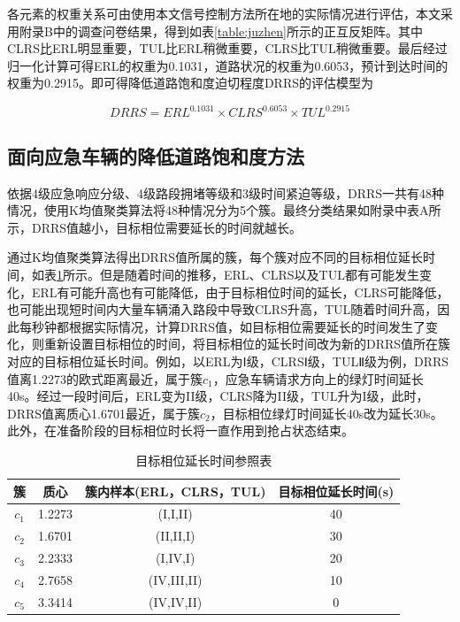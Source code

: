 各元素的权重关系可由使用本文信号控制方法所在地的实际情况进行评估，本文采用附录B中的调查问卷结果，得到如表\ref{table:juzhen}所示的正互反矩阵。其中CLRS比ERL明显重要，TUL比ERL稍微重要，CLRS比TUL稍微重要。最后经过归一化计算可得ERL的权重为0.1031，道路状况的权重为0.6053，预计到达时间的权重为0.2915。即可得降低道路饱和度迫切程度DRRS的评估模型为

\begin{equation}
	\label{equation:DRRS}
	DRRS={ERL}^{0.1031}\times{CLRS}^{0.6053}\times{TUL}^{0.2915} 
\end{equation}

\subsection{面向应急车辆的降低道路饱和度方法}

依据4级应急响应分级、4级路段拥堵等级和3级时间紧迫等级，DRRS一共有48种情况，使用K均值聚类算法将48种情况分为5个簇。最终分类结果如附录中表A所示，DRRS值越小，目标相位需要延长的时间就越长。



通过K均值聚类算法得出DRRS值所属的簇，每个簇对应不同的目标相位延长时间，如表\ref{table:extendtime}所示。但是随着时间的推移，ERL、CLRS以及TUL都有可能发生变化，ERL有可能升高也有可能降低，由于目标相位时间的延长，CLRS可能降低，也可能出现短时间内大量车辆涌入路段中导致CLRS升高，TUL随着时间升高，因此每秒钟都根据实际情况，计算DRRS值，如目标相位需要延长的时间发生了变化，则重新设置目标相位的时间，将目标相位的延长时间改为新的DRRS值所在簇对应的目标相位延长时间。例如，以ERL为Ⅰ级，CLRSⅠ级，TULⅡ级为例，DRRS值离1.2273的欧式距离最近，属于簇${c_1}$，应急车辆请求方向上的绿灯时间延长40s。经过一段时间后，ERL变为II级，CLRS降为II级，TUL升为I级，此时，DRRS值离质心1.6701最近，属于簇${c_2}$，目标相位绿灯时间延长40s改为延长30s。此外，在准备阶段的目标相位时长将一直作用到抢占状态结束。

\begin{table}[H]
	\centering
	\caption{目标相位延长时间参照表}
	\label{table:extendtime}
	\begin{tabular}{|c|c|c|c|}
		\hline
		簇 & 质心 & 簇内样本(ERL，CLRS，TUL) &  目标相位延长时间(s) \\
		\hline
		${c_1}$ & 1.2273 & (I,I,II) & 40 \\ \hline
		${c_2}$ & 1.6701 & (II,II,I) & 30 \\ \hline
		${c_3}$ & 2.2333 & (I,IV,I) & 20 \\ \hline
		${c_4}$ & 2.7658 & (IV,III,II) & 10 \\ \hline
		${c_5}$ & 3.3414 & (IV,IV,II) & 0 \\ \hline
	\end{tabular}
\end{table}


